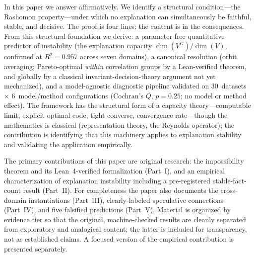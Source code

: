 \documentclass[11pt,a4paper]{article}
\begin{document}
In this paper we answer affirmatively.  We identify a structural
condition---the Rashomon property---under which no explanation can
simultaneously be faithful, stable, and decisive.  The proof is four
lines; the content is in the consequences.  From this structural foundation
we derive: a parameter-free quantitative predictor of instability (the
explanation capacity $\dim(V^G)/\dim(V)$, confirmed at $R^2 = 0.957$
across seven domains), a canonical resolution (orbit averaging;
Pareto-optimal \emph{within} correlation groups by a Lean-verified
theorem, and globally by a classical invariant-decision-theory argument
not yet mechanized), and a
model-agnostic diagnostic pipeline validated on 30~datasets $\times$
6~model/method configurations (Cochran's $Q$, $p = 0.25$; no model or
method effect).  The framework has the structural form of a capacity
theory---computable limit, explicit optimal code, tight converse,
convergence rate---though the mathematics is classical (representation
theory, the Reynolds operator); the contribution is identifying that
this machinery applies to explanation stability and validating the
application empirically.

The primary contributions of this paper are original research: the impossibility
theorem and its Lean~4-verified formalization (Part~I), and an empirical
characterization of explanation instability including a pre-registered stable-fact-count
result (Part~II).  For completeness the paper also documents the cross-domain
instantiations (Part~III), clearly-labeled speculative connections (Part~IV), and five
falsified predictions (Part~V).  Material is organized by evidence tier so that the
original, machine-checked results are cleanly separated from exploratory and analogical
content; the latter is included for transparency, not as established claims.  A focused
version of the empirical contribution is presented separately.
\end{document}
